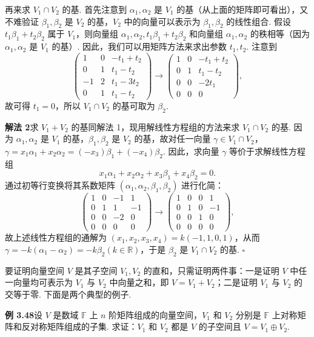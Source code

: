 \documentclass[UTF8,12pt,a4paper,fontset=fandol]{ctexart}
\begin{document}
再来求 $V_1\cap V_2$ 的基. 首先注意到 $\alpha_1,\alpha_2$ 是 $V_1$ 的基（从上面的矩阵即可看出），又不难验证 $\beta_1,\beta_2$ 是 $V_2$ 的基，$V_2$ 中的向量可以表示为 $\beta_1,\beta_2$ 的线性组合. 假设 $t_1\beta_1+t_2\beta_2$ 属于 $V_1$，则向量组 $\alpha_1,\alpha_2,t_1\beta_1+t_2\beta_2$ 和向量组 $\alpha_1,\alpha_2$ 的秩相等（因为 $\alpha_1,\alpha_2$ 是 $V_1$ 的基）. 因此，我们可以用矩阵方法来求出参数 $t_1,t_2$. 注意到
\[
\begin{pmatrix}
1 & 0 & -t_1+t_2\\
0 & 1 & t_1-t_2\\
-1 & 2 & t_1-3t_2\\
0 & 1 & t_1-t_2
\end{pmatrix}
\to
\begin{pmatrix}
1 & 0 & -t_1+t_2\\
0 & 1 & t_1-t_2\\
0 & 0 & -2t_1\\
0 & 0 & 0
\end{pmatrix},
\]
故可得 $t_1=0$，所以 $V_1\cap V_2$ 的基可取为 $\beta_2$.

\noindent\textbf{解法 2}\quad 求 $V_1+V_2$ 的基同解法 1，现用解线性方程组的方法来求 $V_1\cap V_2$ 的基. 因为 $\alpha_1,\alpha_2$ 是 $V_1$ 的基，$\beta_1,\beta_2$ 是 $V_2$ 的基，故对任一向量 $\gamma\in V_1\cap V_2$，$\gamma=x_1\alpha_1+x_2\alpha_2=(-x_3)\beta_1+(-x_4)\beta_2$. 因此，求向量 $\gamma$ 等价于求解线性方程组
\[
x_1\alpha_1+x_2\alpha_2+x_3\beta_1+x_4\beta_2=0.
\]
通过初等行变换将其系数矩阵 $(\alpha_1,\alpha_2,\beta_1,\beta_2)$ 进行化简：
\[
\begin{pmatrix}
1&0&-1&1\\
0&1&1&-1\\
0&0&-2&0\\
0&0&0&0
\end{pmatrix}
\to
\begin{pmatrix}
1&0&0&1\\
0&1&0&-1\\
0&0&1&0\\
0&0&0&0
\end{pmatrix},
\]
故上述线性方程组的通解为 $(x_1,x_2,x_3,x_4)=k(-1,1,0,1)$，从而 $\gamma=-k(\alpha_1-\alpha_2)=-k\beta_2(k\in\mathbb{R})$，于是 $\beta_2$ 是 $V_1\cap V_2$ 的基. $\square$

要证明向量空间 $V$ 是其子空间 $V_1,V_2$ 的直和，只需证明两件事：一是证明 $V$ 中任一向量均可表示为 $V_1$ 与 $V_2$ 中向量之和，即 $V=V_1+V_2$；二是证明 $V_1$ 与 $V_2$ 的交等于零. 下面是两个典型的例子.

\noindent\textbf{例 3.48}\quad 设 $V$ 是数域 $\mathbb{F}$ 上 $n$ 阶矩阵组成的向量空间，$V_1$ 和 $V_2$ 分别是 $\mathbb{F}$ 上对称矩阵和反对称矩阵组成的子集. 求证：$V_1$ 和 $V_2$ 都是 $V$ 的子空间且 $V=V_1\oplus V_2$.
\end{document}
